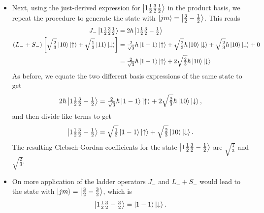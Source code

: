 \documentclass[11pt, a4paper]{article}
\newcommand{\ua}{\uparrow}  %
\newcommand{\da}{\downarrow}  %
\begin{document}
\begin{itemize}
    \item Next, using the just-derived expression for $ \ket{1 \tfrac{1}{2} \tfrac{3}{2} \tfrac{1}{2}} $ in the product basis, we repeat the procedure to generate the state with $ \ket{jm} = \ket{\tfrac{3}{2}-\tfrac{1}{2}} $. This reads
    \begin{align*}
        J_{-}\ket{1 \tfrac{1}{2}\tfrac{3}{2}\tfrac{1}{2}} &= 2 \hbar \ket{1 \tfrac{1}{2}\tfrac{3}{2}-\tfrac{1}{2}}\\
        (L_{-} + S_{-}) \left[ \sqrt{\tfrac{2}{3}}\ket{10}\ket{\ua} + \sqrt{\tfrac{1}{3}} \ket{11}\ket{\da} \right] &= \tfrac{2}{\sqrt{3}} \hbar \ket{1-1}\ket{\ua} + \sqrt{\tfrac{2}{3}}\hbar \ket{10}\ket{\da} + \sqrt{\tfrac{2}{3}} \hbar \ket{10}\ket{\da} + 0\\
        & = \tfrac{2}{\sqrt{3}} \hbar \ket{1-1}\ket{\ua} + 2\sqrt{\tfrac{2}{3}}\hbar \ket{10}\ket{\da}
    \end{align*}
    As before, we equate the two different basis expressions of the same state to get
    \begin{equation*}
        2 \hbar \ket{1 \tfrac{1}{2}\tfrac{3}{2}-\tfrac{1}{2}} = \tfrac{2}{\sqrt{3}} \hbar \ket{1-1}\ket{\ua} + 2\sqrt{\tfrac{2}{3}}\hbar \ket{10}\ket{\da},
    \end{equation*}
    and then divide like terms to get
    \begin{equation*}
        \ket{1 \tfrac{1}{2}\tfrac{3}{2}-\tfrac{1}{2}} = \sqrt{\tfrac{1}{3}} \ket{1-1}\ket{\ua} + \sqrt{\tfrac{2}{3}} \ket{10}\ket{\da}.
    \end{equation*}
    The resulting Clebsch-Gordan coefficients for the state $ \ket{1 \tfrac{1}{2} \tfrac{3}{2} - \tfrac{1}{2}} $ are $ \sqrt{\tfrac{1}{3}} $ and $ \sqrt{\tfrac{2}{3}} $.
    

    \item On more application of the ladder operators $ J_{-} $ and $ L_{-} + S_{-} $ would lead to the state with $ \ket{jm} = \ket{\tfrac{3}{2}-\tfrac{3}{2}} $, which is
    \begin{equation*}
        \ket{1 \tfrac{1}{2}\tfrac{3}{2} -\tfrac{3}{2}} = \ket{1-1}\ket{\da}.
    \end{equation*}
    

\end{itemize}
\end{document}
